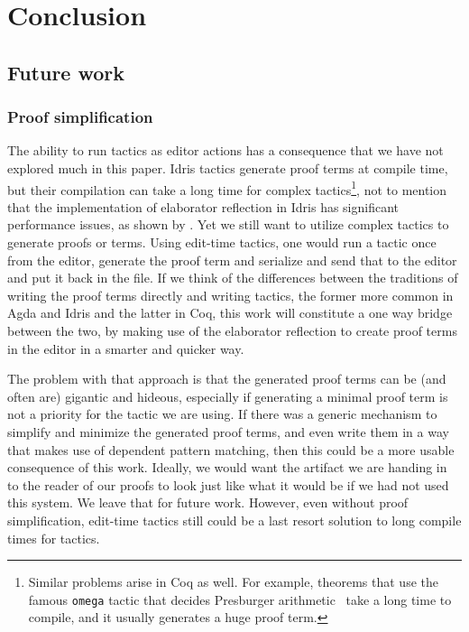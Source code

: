 \section{Conclusion}\label{chap:conclusion}

\subsection{Future work}

\subsubsection{Proof simplification}

The ability to run tactics as editor actions has a consequence
that we have not explored much in this paper.
Idris tactics generate proof terms at compile time, but their
compilation can take a long time for complex tactics\footnote{Similar problems
arise in Coq as well. For example, theorems that use the famous \texttt{omega}
tactic that decides Presburger arithmetic~\cite{omega} take a long time to compile, and it
usually generates a huge proof term.},
not to mention that the implementation of elaborator
reflection in Idris has significant performance issues, as shown by \citet{leanmeta}.
Yet we still want to utilize complex tactics to generate proofs or terms.
Using edit-time tactics, one would run a tactic once from the editor, generate
the proof term and serialize and send that to the editor and put it back in the
file.
If we think of the differences between the traditions of writing the proof
terms directly and writing tactics, the former more common in Agda and Idris
and the latter in Coq, this work will constitute a one way bridge
between the two, by making use of the elaborator reflection to create proof
terms in the editor in a smarter and quicker way.

The problem with that approach is that the generated proof terms can be (and
often are) gigantic and hideous, especially if generating a minimal proof term
is not a priority for the tactic we are using.
If there was a generic mechanism to simplify and minimize the generated proof
terms, and even write them in a way that makes use of dependent pattern
matching, then this could be a more usable consequence of this work.
Ideally, we would want the artifact we are handing in to the reader of our
proofs to look just like what it would be if we had not used this system.
We leave that for future work.  However, even without proof simplification,
edit-time tactics still could be a last resort solution to long compile times
for tactics.

